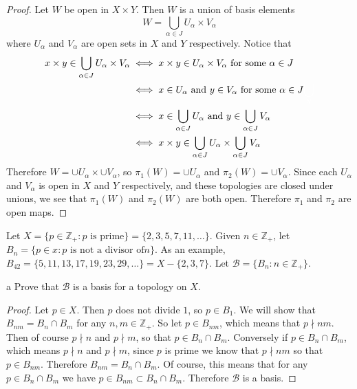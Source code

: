 \documentclass[11pt]{article}
\begin{document}
\begin{proof}
  Let $W$ be open in $X \times Y$. Then $W$ is a union of basis elements
  \[ W = \bigcup_{\alpha \in J} U_\alpha \times V_\alpha \]
  where $U_\alpha$ and $V_\alpha$ are open sets in $X$ and $Y$ respectively.
  Notice that
  \begin{align*}
    x \times y \in \bigcup_{\alpha \in J} U_\alpha \times V_\alpha
      &\iff x \times y \in U_\alpha \times V_\alpha \text{ for some } \alpha \in J \\
      &\iff x \in U_\alpha \text{ and } y \in V_\alpha \text{ for some } \alpha \in J
        \phantombackup{\bigcup_X}\\
      &\iff x \in \bigcup_{\alpha \in J} U_\alpha \text{ and } y \in \bigcup_{\alpha \in J} V_\alpha \\
      &\iff x \times y \in
        \bigcup_{\alpha \in J} U_\alpha \times \bigcup_{\alpha \in J} V_\alpha
  \end{align*}
  Therefore $W = \cup U_\alpha \times \cup V_\alpha$, so $\pi_1(W) = \cup
  U_\alpha$ and $\pi_2(W) = \cup V_\alpha$. Since each $U_\alpha$ and $V_\alpha$
  is open in $X$ and $Y$ respectively, and these topologies are closed under
  unions, we see that $\pi_1(W)$ and $\pi_2(W)$ are both open. Therefore $\pi_1$
  and $\pi_2$ are open maps.
\end{proof}


\noindent Let $X = \{p \in \mathbb{Z}_+ : p \text{ is prime}\} = \{2, 3, 5, 7, 11, \ldots \}$.
Given $n \in \mathbb{Z}_+$, let $B_n = \{p \in x : p \text{ is not a divisor of
} n\}.$ As an example, $B_{42} = \{5, 11, 13, 17, 19, 23, 29,\ldots\} = X -
\{2, 3, 7\}.$ Let $\mathcal{B} = \{B_n : n \in \mathbb{Z}_+\}.$

\begin{p}{a}
  Prove that $\mathcal{B}$ is a basis for a topology on $X$.
\end{p}

\begin{proof}
  Let $p \in X$. Then $p$ does not divide $1$, so $p \in B_1$. We will show that
  $B_{nm} = B_n \cap B_m$ for any $n, m \in \mathbb{Z}_+$. So let $p \in
  B_{nm}$, which means that $p \nmid nm$.  Then of course $p
  \nmid n$ and $p \nmid m$, so that $p \in B_n \cap B_m$. Conversely if $p \in
  B_n \cap B_m$, which means $p \nmid n$ and $p \nmid m$, since $p$ is prime we
  know that $p \nmid nm$ so that $p \in B_{nm}$. Therefore $B_{nm} = B_n \cap
  B_m$. Of course, this means that for any $p \in B_n \cap B_m$ we have $p \in
  B_{nm} \subset B_n \cap B_m$. Therefore $\mathcal{B}$ is a basis.
\end{proof}
\end{document}
